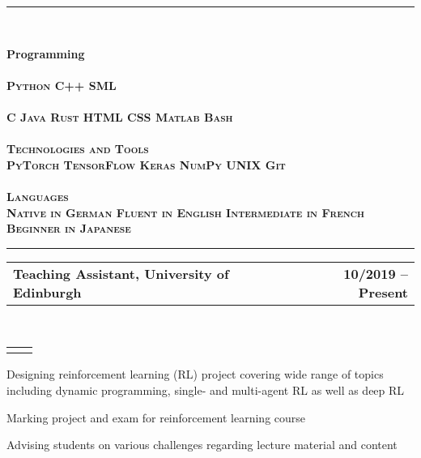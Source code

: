 \documentclass[]{lukas-cv-openfont}
\makeatletter
\newcommand{\headerrow}[2]
{\begin{tabular*}{\linewidth}{l@{\extracolsep{\fill}}r}
	\fontspec{Helvetica}\fontsize{12pt}{12pt}\selectfont\bfseries{\color{subheadings}#1} &
	\fontspec{Helvetica}\fontsize{12pt}{12pt}\selectfont\bfseries{\color{subheadings}#2} \\
\end{tabular*}}
\newcommand{\locationrow}[2]
{\begin{tabular*}{\linewidth}{l@{\extracolsep{\fill}}r}
        \color{headings}\scshape\fontspec{Heiti TC Medium}\fontsize{10pt}{12pt}\selectfont{#1}  &
        \color{headings}\scshape\fontspec{Heiti TC Medium}\fontsize{10pt}{12pt}\selectfont{#2}  \\
\end{tabular*}}
\makeatother
\begin{document}
\hrule
\ \vspace{-1em}
\begin{multicols}{2}
    \raggedright
    \setlength{\columnsep}{1.5cm}
    \setlength{\columnseprule}{0.2pt}
    \noindent
    \fontsize{12pt}{12pt}\selectfont\bfseries{\color{subheadings}Programming} \vspace{0.3em} \\
    \color{headings}\scshape{}\fontsize{10pt}{10pt}\selectfont{Competent}\\
    \fontsize{10pt}{8pt}\selectfont \color{primary}Python \textbullet{} C++ \textbullet{} SML
    \ \vspace{0.3em} \\
    \color{headings}\scshape{}\fontsize{10pt}{10pt}\selectfont{Familiar}\\
    \fontsize{10pt}{8pt}\selectfont\color{primary}C \textbullet{} Java \textbullet{} Rust \textbullet{} HTML \textbullet{} CSS \textbullet{} Matlab \textbullet{} Bash\\
    \ \\
    \raggedleft
    \fontsize{12pt}{12pt}\selectfont\bfseries{\color{subheadings}Technologies and Tools}\\
    \fontsize{10pt}{8pt}\selectfont \color{primary}PyTorch \textbullet{} TensorFlow \textbullet{} Keras \textbullet{} NumPy \textbullet{} UNIX \textbullet{} Git\\
    \ \\
    \fontsize{12pt}{12pt}\selectfont\bfseries{\color{subheadings}Languages}\\
    \fontsize{10pt}{8pt}\selectfont \color{primary}Native in German \textbullet{} Fluent in English \textbullet{} Intermediate in French \textbullet{} Beginner in Japanese
\end{multicols}

\hrule
\vspace{0.4em}

\noindent
\headerrow{Teaching Assistant, University of Edinburgh}{10/2019 -- Present}
\\
\locationrow{Reinforcement Learning, School of Informatics}{}
\begin{tightitemize}{1.7em}
    \item Designing reinforcement learning (RL) project covering wide range of topics including dynamic programming, single- and multi-agent RL as well as deep RL
    \item Marking project and exam for reinforcement learning course
    \item Advising students on various challenges regarding lecture material and content
\end{tightitemize}
\largesectionsep
\end{document}
